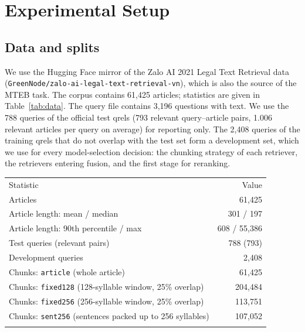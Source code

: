 \documentclass{ws-vjcs}
\begin{document}
\section{Experimental Setup}

\subsection{Data and splits}

We use the Hugging Face mirror of the Zalo AI 2021 Legal Text Retrieval data (\texttt{GreenNode/zalo-ai-legal-text-retrieval-vn}), which is also the source of the MTEB task. The corpus contains 61,425 articles; statistics are given in Table~\ref{tab:data}. The query file contains 3,196 questions with text. We use the 788 queries of the official test qrels (793 relevant query--article pairs, 1.006 relevant articles per query on average) for reporting only. The 2,408 queries of the training qrels that do not overlap with the test set form a development set, which we use for every model-selection decision: the chunking strategy of each retriever, the retrievers entering fusion, and the first stage for reranking.

\begin{table}[t]
{\begin{tabular}{@{}lr@{}} \toprule
Statistic & Value \\ \colrule
Articles & 61,425 \\
Article length: mean / median & 301 / 197 \\
Article length: 90th percentile / max & 608 / 55,386 \\
Test queries (relevant pairs) & 788 (793) \\
Development queries & 2,408 \\ \colrule
Chunks: \texttt{article} (whole article) & 61,425 \\
Chunks: \texttt{fixed128} (128-syllable window, 25\% overlap) & 204,484 \\
Chunks: \texttt{fixed256} (256-syllable window, 25\% overlap) & 113,751 \\
Chunks: \texttt{sent256} (sentences packed up to 256 syllables) & 107,052 \\ \botrule
\end{tabular}}
\end{table}
\end{document}

